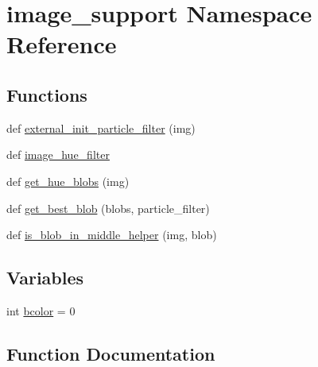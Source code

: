 \section{image\+\_\+support Namespace Reference}
\label{namespaceimage__support}
\subsection*{Functions}
\begin{DoxyCompactItemize}
\item 
def \hyperlink{namespaceimage__support_a45e637a8685d23a453229102a4346327}{external\+\_\+init\+\_\+particle\+\_\+filter} (img)
\item 
def \hyperlink{namespaceimage__support_aff0422e55f0d6119a012115570442c3f}{image\+\_\+hue\+\_\+filter}
\item 
def \hyperlink{namespaceimage__support_aaa6d938c26b4ad5878e1bfb6870e749b}{get\+\_\+hue\+\_\+blobs} (img)
\item 
def \hyperlink{namespaceimage__support_a0cebf9b300caec4b9e3f7725204f7f63}{get\+\_\+best\+\_\+blob} (blobs, particle\+\_\+filter)
\item 
def \hyperlink{namespaceimage__support_ae76ebc019a04c735f46210bc29e55f76}{is\+\_\+blob\+\_\+in\+\_\+middle\+\_\+helper} (img, blob)
\end{DoxyCompactItemize}
\subsection*{Variables}
\begin{DoxyCompactItemize}
\item 
int \hyperlink{namespaceimage__support_a1cfece0a81077dca0136b23884fb318d}{bcolor} = 0
\end{DoxyCompactItemize}


\subsection{Function Documentation}
